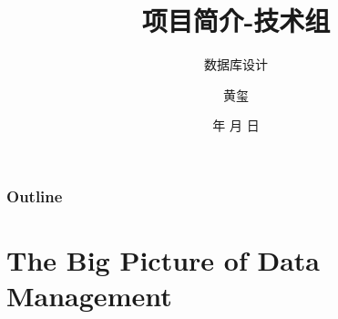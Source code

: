 \documentclass{beamer}
\begin{document}
\title{项目简介-技术组}
\subtitle{数据库设计}

\author{黄玺}


\renewcommand{\today}{\number\year 年 \number\month 月 \number\day 日}
\date{\today}

\subject{Presentations}

\begin{frame}
\titlepage
\end{frame}

\begin{frame}
\frametitle{Outline}
\end{frame}

\section{The Big Picture of Data Management}
\end{document}
